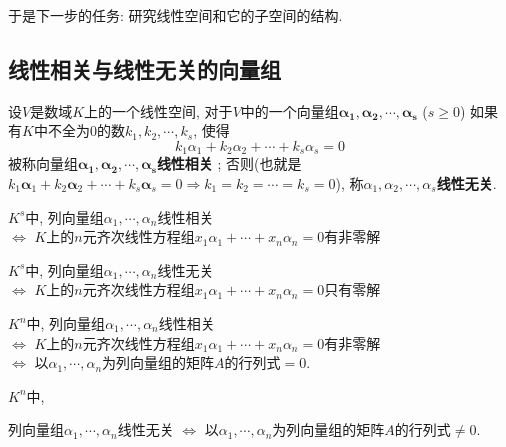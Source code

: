 \begin{Note}于是下一步的任务: 研究线性空间和它的子空间的结构.
\end{Note}

\subsection{线性相关与线性无关的向量组}

\begin{Definition}[线性相关]
设$V$是数域$K$上的一个线性空间, 对于$V$中的一个向量组$\mathbf{\alpha_1}, \mathbf{\alpha_2}, \cdots, \mathbf{\alpha_s}$ ($s \ge 0$)
如果有$K$中不全为$0$的数$k_1, k_2, \cdots, k_s$, 使得
$$
k_1 \alpha_1 + k_2 \alpha_2 + \cdots + k_s \alpha_s = 0
$$
被称向量组$\mathbf{\alpha_1}, \mathbf{\alpha_2}, \cdots, \mathbf{\alpha_s}$\textbf{线性相关} 
; 否则(也就是$k_1 \mathbf{\alpha}_1 + k_2 \mathbf{\alpha}_2 + \cdots + k_s \mathbf{\alpha}_s = 0 \Rightarrow k_1 = k_2 = \cdots = k_s = 0$), 称$\alpha_1, \alpha_2, \cdots, \alpha_s$\textbf{线性无关}.
\end{Definition}

\begin{Note}[!]
$K^s$中, 列向量组$\alpha_1, \cdots, \alpha_n$线性相关 \\
$\Leftrightarrow$ $K$上的$n$元齐次线性方程组$x_1 \alpha_1 + \cdots +x_n \alpha_n = 0$有非零解
\end{Note}

\begin{Note}[!]
$K^s$中, 列向量组$\alpha_1, \cdots, \alpha_n$线性无关 \\
$\Leftrightarrow$ $K$上的$n$元齐次线性方程组$x_1 \alpha_1  + \cdots +x_n \alpha_n = 0$只有零解
\end{Note}

\begin{Note}
$K^{n}$中, 列向量组$\alpha_1, \cdots, \alpha_n$线性相关 \\
$\Leftrightarrow$ $K$上的$n$元齐次线性方程组$x_1 \alpha_1 + \cdots +x_n \alpha_n = 0$有非零解 \\
$\Leftrightarrow$ 以$\alpha_1, \cdots, \alpha_n$为列向量组的矩阵$A$的行列式$=0$.
\end{Note}

\begin{Note}[!!!!]
$K^{n}$中, 
\begin{tightcenter}
列向量组$\alpha_1, \cdots, \alpha_n$线性无关
$\Leftrightarrow$ 以$\alpha_1, \cdots, \alpha_n$为列向量组的矩阵$A$的行列式$\neq 0$.
\end{tightcenter}
\end{Note}

